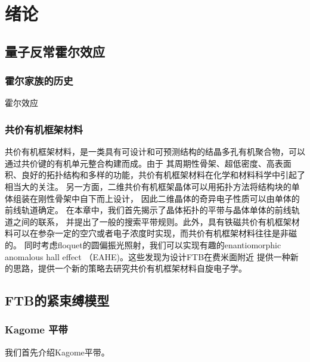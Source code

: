 \chapter{绪论}

\section{量子反常霍尔效应}

\subsection{霍尔家族的历史}
霍尔效应

\subsection{共价有机框架材料}
共价有机框架材料，是一类具有可设计和可预测结构的结晶多孔有机聚合物，可以通过共价键的有机单元整合构建而成。由于
其周期性骨架、超低密度、高表面积、良好的拓扑结构和多样的功能，共价有机框架材料在化学和材料科学中引起了相当大的关注。
另一方面，二维共价有机框架晶体可以用拓扑方法将结构块的单体组装在刚性骨架中自下而上设计，
因此二维晶体的奇异电子性质可以由单体的前线轨道确定。 在本章中，我们首先揭示了晶体拓扑的平带与晶体单体的前线轨道之间的联系，
并提出了一般的搜索平带规则。此外，具有铁磁共价有机框架材料可以在参杂一定的空穴或者电子浓度时实现，而共价有机框架材料往往是非磁的。
同时考虑floquet的圆偏振光照射，我们可以实现有趣的enantiomorphic anomalous hall effect （EAHE)。这些发现为设计FTB在费米面附近
提供一种新的思路，提供一个新的策略去研究共价有机框架材料自旋电子学。



\section{FTB的紧束缚模型}

\subsection{Kagome 平带}
我们首先介绍Kagome平带。